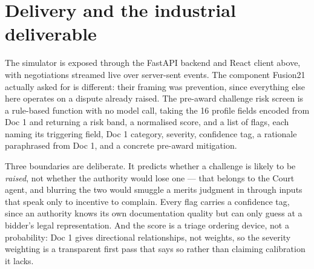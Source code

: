 \section{Delivery and the industrial deliverable}
\label{sec:risk-screen}

The simulator is exposed through the FastAPI backend and React client
above, with negotiations streamed live over server-sent events.
The component Fusion21 actually asked for is different: their framing was
prevention, since everything else here operates on a dispute already
raised. The pre-award challenge risk screen is a rule-based function with no
model call, taking the 16 profile fields encoded from Doc 1 and returning a
risk band, a normalised score, and a list of flags, each naming its
triggering field, Doc 1 category, severity, confidence tag, a rationale
paraphrased from Doc 1, and a concrete pre-award mitigation.

Three boundaries are deliberate. It predicts whether a challenge is likely
to be \emph{raised}, not whether the authority would lose one --- that
belongs to the Court agent, and blurring the two would smuggle a merits
judgment in through inputs that speak only to incentive to complain. Every
flag carries a confidence tag, since an authority knows its own
documentation quality but can only guess at a bidder's legal
representation. And the score is a triage ordering device, not a
probability: Doc 1 gives directional relationships, not weights, so the
severity weighting is a transparent first pass that says so rather than
claiming calibration it lacks.

